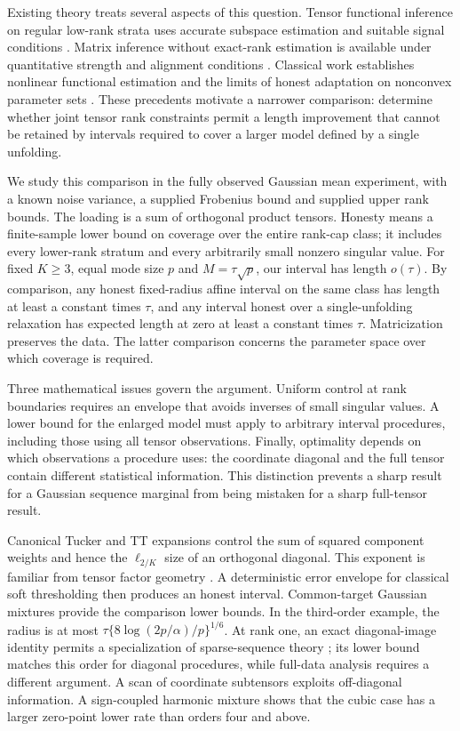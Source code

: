 \documentclass[11pt]{article}
\theoremstyle{remark}
\begin{document}
Existing theory treats several aspects of this question. Tensor functional inference on regular low-rank strata uses accurate subspace estimation and suitable signal conditions \citep{xu2025}. Matrix inference without exact-rank estimation is available under quantitative strength and alignment conditions \citep{choi2026}. Classical work establishes nonlinear functional estimation and the limits of honest adaptation on nonconvex parameter sets \citep{cailownonconvex2004,cailow2004,collier2017}. These precedents motivate a narrower comparison: determine whether joint tensor rank constraints permit a length improvement that cannot be retained by intervals required to cover a larger model defined by a single unfolding.

We study this comparison in the fully observed Gaussian mean experiment, with a known noise variance, a supplied Frobenius bound and supplied upper rank bounds. The loading is a sum of orthogonal product tensors. Honesty means a finite-sample lower bound on coverage over the entire rank-cap class; it includes every lower-rank stratum and every arbitrarily small nonzero singular value. For fixed $K\ge3$, equal mode size $p$ and $M=\tau\sqrt p$, our interval has length $o(\tau)$. By comparison, any honest fixed-radius affine interval on the same class has length at least a constant times $\tau$, and any interval honest over a single-unfolding relaxation has expected length at zero at least a constant times $\tau$. Matricization preserves the data. The latter comparison concerns the parameter space over which coverage is required.

Three mathematical issues govern the argument. Uniform control at rank boundaries requires an envelope that avoids inverses of small singular values. A lower bound for the enlarged model must apply to arbitrary interval procedures, including those using all tensor observations. Finally, optimality depends on which observations a procedure uses: the coordinate diagonal and the full tensor contain different statistical information. This distinction prevents a sharp result for a Gaussian sequence marginal from being mistaken for a sharp full-tensor result.

Canonical Tucker and TT expansions control the sum of squared component weights and hence the $\ell_{2/K}$ size of an orthogonal diagonal. This exponent is familiar from tensor factor geometry \citep{fan2023}. A deterministic error envelope for classical soft thresholding \citep{donohojohnstone1994} then produces an honest interval. Common-target Gaussian mixtures provide the comparison lower bounds. In the third-order example, the radius is at most $\tau\{8\log(2p/\alpha)/p\}^{1/6}$. At rank one, an exact diagonal-image identity permits a specialization of sparse-sequence theory \citep{collier2017}; its lower bound matches this order for diagonal procedures, while full-data analysis requires a different argument. A scan of coordinate subtensors exploits off-diagonal information. A sign-coupled harmonic mixture shows that the cubic case has a larger zero-point lower rate than orders four and above.
\end{document}
